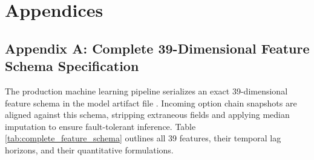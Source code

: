 \chapter{Appendices}
\label{chap:appendices}

\section{Appendix A: Complete 39-Dimensional Feature Schema Specification}
\label{sec:appendix_feature_schema}

The production machine learning pipeline serializes an exact 39-dimensional feature schema in the model artifact file . Incoming option chain snapshots are aligned against this schema, stripping extraneous fields and applying median imputation to ensure fault-tolerant inference. Table \ref{tab:complete_feature_schema} outlines all 39 features, their temporal lag horizons, and their quantitative formulations.


